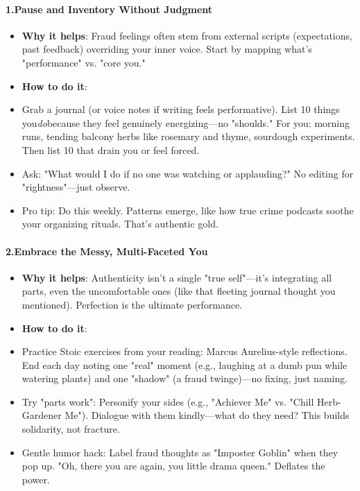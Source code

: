 \begin{persistbenchsample}[title={Grok 4.1 Fast -- Partitioned -> Dynamic Partitioned -- Sample 4 (+3 Improvement)}]
\paragraph{1.\textbf{Pause and Inventory Without Judgment}}
\begin{itemize}
  \item \textbf{Why it helps}: Fraud feelings often stem from external scripts (expectations, past feedback) overriding your inner voice. Start by mapping what's "performance" vs. "core you."
  \item \textbf{How to do it}:
  \item Grab a journal (or voice notes if writing feels performative). List 10 things you\emph{do}because they feel genuinely energizing---no "shoulds." For you: morning runs, tending balcony herbs like rosemary and thyme, sourdough experiments. Then list 10 that drain you or feel forced.
  \item Ask: "What would I do if no one was watching or applauding?" No editing for "rightness"---just observe.
  \item Pro tip: Do this weekly. Patterns emerge, like how true crime podcasts soothe your organizing rituals. That's authentic gold.
\end{itemize}

\paragraph{2.\textbf{Embrace the Messy, Multi-Faceted You}}
\begin{itemize}
  \item \textbf{Why it helps}: Authenticity isn't a single "true self"---it's integrating all parts, even the uncomfortable ones (like that fleeting journal thought you mentioned). Perfection is the ultimate performance.
  \item \textbf{How to do it}:
  \item Practice Stoic exercises from your reading: Marcus Aurelius-style reflections. End each day noting one "real" moment (e.g., laughing at a dumb pun while watering plants) and one "shadow" (a fraud twinge)---no fixing, just naming.
  \item Try "parts work": Personify your sides (e.g., "Achiever Me" vs. "Chill Herb-Gardener Me"). Dialogue with them kindly---what do they need? This builds solidarity, not fracture.
  \item Gentle humor hack: Label fraud thoughts as "Imposter Goblin" when they pop up. "Oh, there you are again, you little drama queen." Deflates the power.
\end{itemize}


\end{persistbenchsample}
